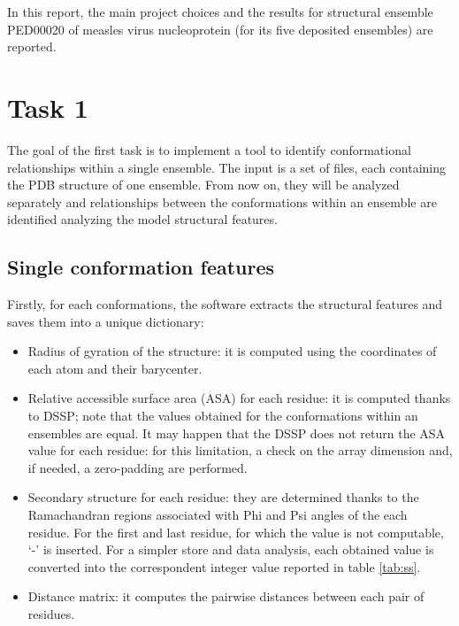 In this report, the main project choices and the results for structural ensemble PED00020 of measles virus nucleoprotein (for its five deposited ensembles) are reported.

\section{Task 1}\label{sec:task1}
\graphicspath{ {./figures/} }

The goal of the first task is to implement a tool to identify conformational relationships within a single ensemble. The input is a set of files, each containing the PDB structure of one ensemble. From now on, they will be analyzed separately and relationships between the conformations within an ensemble are identified analyzing the model structural features. 


\subsection{Single conformation features}

Firstly, for each conformations, the software extracts the structural features and saves them into a unique dictionary:
\begin{itemize}
\item Radius of gyration of the structure: it is computed using the coordinates of each atom and their barycenter.
\item Relative accessible surface area (ASA) for each residue: it is computed thanks to DSSP; note that the values obtained for the conformations within an ensembles are equal. It may happen that the DSSP does not return the ASA value for each residue: for this limitation, a check on the array dimension and, if needed, a zero-padding are performed. 
\item Secondary structure for each residue: they are determined thanks to the Ramachandran regions associated with Phi and Psi angles of the each residue. For the first and last residue, for which the value is not computable, `-' is inserted. For a simpler store and data analysis, each obtained value is converted into the correspondent integer value reported in table \ref{tab:ss}. 
\item Distance matrix: it computes the pairwise distances between each pair of residues.%
\end{itemize}


